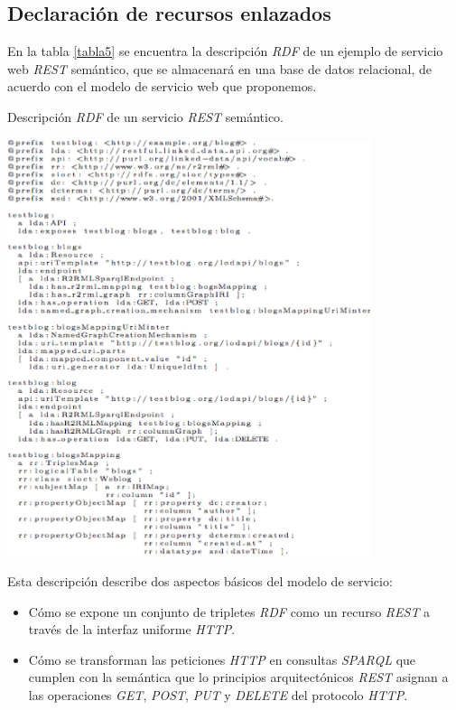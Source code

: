 \subsection{Declaraci\'on de recursos enlazados}

En la tabla \ref{tabla5} se encuentra la descripci\'on \textit{RDF} de un ejemplo de servicio web \textit{REST} sem\'antico, que se almacenar\'a en una base de datos relacional, de acuerdo con el modelo de servicio web que proponemos.\\

\begin{table}
\vspace{2.4in}
\caption{Descripci\'on \textit{RDF} de un servicio \textit{REST} sem\'antico.}
\includegraphics[width=0.8\textwidth]{tabla5}
\label{tabla5}
\end{table}

Esta descripci\'on describe dos aspectos b\'asicos del modelo de servicio:

\begin{itemize}
\item C\'omo se expone un conjunto de tripletes \textit{RDF} como un recurso \textit{REST} a trav\'es de la interfaz uniforme \textit{HTTP}.
\item C\'omo se transforman las peticiones \textit{HTTP} en consultas \textit{SPARQL} que cumplen con la sem\'antica que lo principios arquitect\'onicos \textit{REST} asignan a las operaciones \textit{GET}, \textit{POST}, \textit{PUT} y \textit{DELETE} del protocolo \textit{HTTP}.
\end{itemize}

